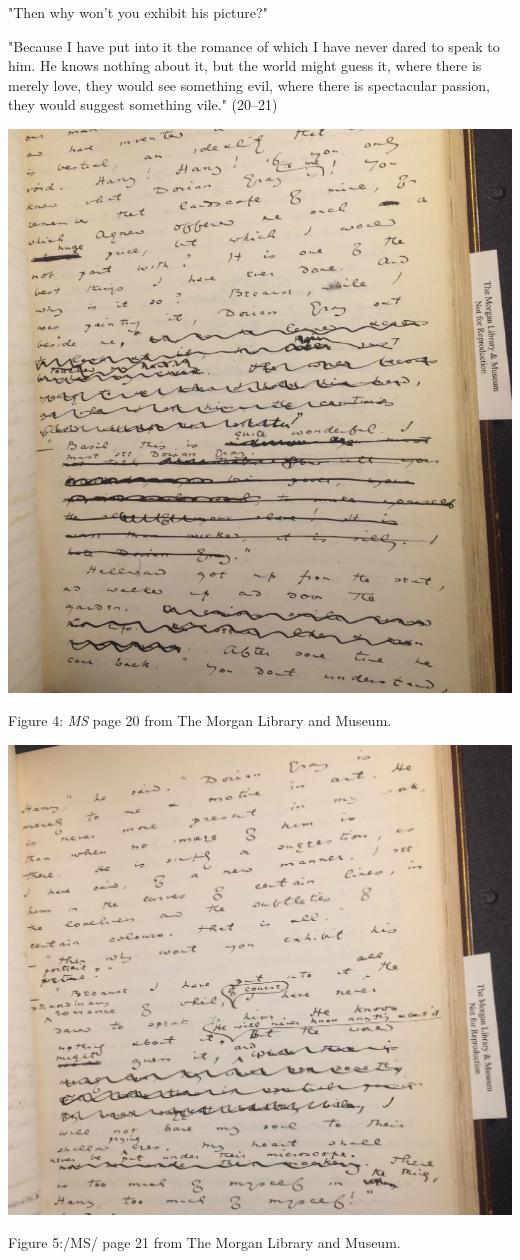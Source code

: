 \documentclass[11pt]{article}
\begin{document}
"Then why won't you exhibit his picture?"

"Because I have put into it the romance of which I have never dared to
speak to him. He knows nothing about it, but the world might guess it,
where there is merely love, they would see something evil, where there
is spectacular passion, they would suggest something vile." (20--21)

\begin{center}
\includegraphics[width=.9\linewidth]{./figure4.png}
\end{center}
Figure 4: \emph{MS} page 20 from The Morgan Library and
Museum. 

\begin{center}
\includegraphics[width=.9\linewidth]{./figure5.png}
\end{center}
Figure 5:/MS/ page 21 from The Morgan Library and
Museum. 
\end{document}
